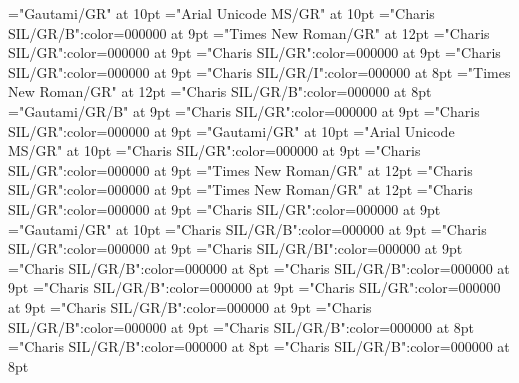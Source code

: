 \documentclass[gps1,twoside]{article}
\begin{document}
\pagestyle{plain}
\sloppy
\setlength{\parfillskip}{0pt plus 1fil}
\font\xitemte="Gautami/GR" at 10pt
\font\xitemhi="Arial Unicode MS/GR" at 10pt
\font\xitemxitemcomplexformformbefore="Charis SIL/GR/B":color=000000 at 9pt
\font\xitemxitemcomplexformrefsbefore="Times New Roman/GR" at 12pt
\font\xitemxitemdefinitionbefore="Charis SIL/GR":color=000000 at 9pt
\font\xitemxitementryrefcomponentbefore="Charis SIL/GR":color=000000 at 9pt
\font\xitemxitementryreftypebefore="Charis SIL/GR":color=000000 at 9pt
\font\xitemxitemexamplebefore="Charis SIL/GR/I":color=000000 at 8pt
\font\xitemxitemexamplesbefore="Times New Roman/GR" at 12pt
\font\xitemxitemheadwordbefore="Charis SIL/GR/B":color=000000 at 8pt
\font\xitemxitemLexEntrypublishStemComponentTargetHeadWordRefbefore="Gautami/GR/B" at 9pt
\font\xitemxitemLexEntryTypepublishStemComplexFormTypeReverseAbbrPubbefore="Charis SIL/GR":color=000000 at 9pt
\font\xitemxitemLexEntryTypepublishStemEntryTypeAbbreviationPubbefore="Charis SIL/GR":color=000000 at 9pt
\font\xitemxitemLexSensepublishStemGlossPubLdbefore="Gautami/GR" at 10pt
\font\xitemxitemLexSensepublishStemGlossPubLebefore="Arial Unicode MS/GR" at 10pt
\font\xitemxitempartofspeechbefore="Charis SIL/GR":color=000000 at 9pt
\font\xitemxitempictureLabelbefore="Charis SIL/GR":color=000000 at 9pt
\font\xitemxitemprimaryrefsbefore="Times New Roman/GR" at 12pt
\font\xitemxitempronunciationbefore="Charis SIL/GR":color=000000 at 9pt
\font\xitemxitempronunciationsbefore="Times New Roman/GR" at 12pt
\font\sensesensesensesbefore="Charis SIL/GR":color=000000 at 9pt
\font\xitemxitemtranslationbefore="Charis SIL/GR":color=000000 at 9pt
\font\xitemxitemtranslationLdbefore="Gautami/GR" at 10pt
\font\xitemxitemcrossrefbefore="Charis SIL/GR/B":color=000000 at 9pt
\font\xitemxitemcrossreftargetsbefore="Charis SIL/GR":color=000000 at 9pt
\font\xitemxitemcrossreftypebefore="Charis SIL/GR/BI":color=000000 at 9pt
\font\xitemxitemheadwordminorbefore="Charis SIL/GR/B":color=000000 at 8pt
\font\xitemxitemmainentryrefbefore="Charis SIL/GR/B":color=000000 at 9pt
\font\xitemxitemmainentryrefminorbefore="Charis SIL/GR/B":color=000000 at 9pt
\font\xitemxitempronunciationminorbefore="Charis SIL/GR":color=000000 at 9pt
\font\xitemxitemsensecrossrefbefore="Charis SIL/GR/B":color=000000 at 9pt
\font\xitemxitemsensemainentryrefbefore="Charis SIL/GR/B":color=000000 at 9pt
\font\xitemxitemheadwordsubbefore="Charis SIL/GR/B":color=000000 at 8pt
\font\xitemxitemLexEntrypublishRootMinorPrimaryTargetMLHeadWordPubbefore="Charis SIL/GR/B":color=000000 at 8pt
\font\xitemxitemLexEntrypublishStemMinorPrimaryTargetMLHeadWordPubbefore="Charis SIL/GR/B":color=000000 at 8pt
\end{document}
